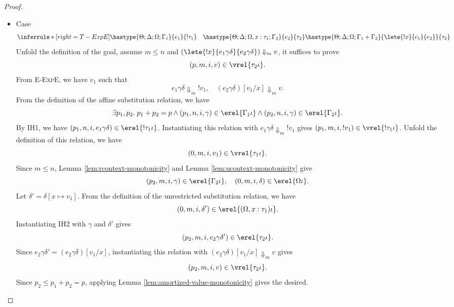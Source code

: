 \begin{proof}
\begin{itemize}
\item Case
\[
  \inferrule*[right=T-ExpE]
    {\hastype{\Theta;\Delta;\Omega;\Gamma_1}{e_1}{!\tau_1}
      \quad\hastype{\Theta;\Delta;\Omega,x:\tau_1;\Gamma_2}{e_2}{\tau_2}}
    {\hastype{\Theta;\Delta;\Omega;\Gamma_1+\Gamma_2}
      {\lete{!x}{e_1}{e_2}}{\tau_2}}
\]
Unfold the definition of the goal, assume $m\leq n$ and
$(\lete{!x}{e_1\gamma\delta}{e_2\gamma\delta})\Downarrow_m v$, it suffices to prove
\[(p, m, i, v)\in\vrel{\tau_2\iota}.\]
From \textsc{E-ExpE}, we have $v_1$ such that
\[
  e_1\gamma\delta\Downarrow_m !v_1, \quad (e_2\gamma\delta)[v_1/x]\Downarrow_m v.
\]
From the definition of the affine substitution relation, we have
\[
  \exists p_1, p_2.\;p_1 + p_2= p \land
  (p_1,n,i,\gamma) \in \erel{\Gamma_1\iota} \land
  (p_2,n, i, \gamma) \in \erel{\Gamma_2\iota}.
\]
By IH1, we have $(p_1, n, i, e_1\gamma\delta)\in\erel{!\tau_1\iota}$. Instantiating this relation with
$e_1\gamma\delta\Downarrow_m !v_1$ gives $(p_1, m, i, !v_1)\in\vrel{!\tau_1\iota}$.
Unfold the definition of this relation, we have
\[(0, m, i, v_1)\in\vrel{\tau_1\iota}.\]
Since $m \leq n$, Lemma \ref{lem:rcontext-monotonicity} and Lemma \ref{lem:ucontext-monotonicity} give
\[(p_2, m, i, \gamma)\in\erel{\Gamma_2\iota}, \quad (0, m, i, \delta)\in\erel{\Omega\iota}.\]
Let $\delta' = \delta[x\mapsto v_1]$. From the definition of the unrestricted substitution relation, we have
\[(0, m, i, \delta')\in\erel{(\Omega, x:\tau_1)\iota}.\]
Instantiating IH2 with $\gamma$ and $\delta'$ gives
\[(p_2, m, i, e_2\gamma\delta')\in\erel{\tau_2\iota}.\]
Since $e_2\gamma\delta' = (e_2\gamma\delta)[v_1/x]$, instantiating this relation with
$(e_2\gamma\delta)[v_1/x]\Downarrow_m v$ gives
\[(p_2, m, i, v)\in\vrel{\tau_2\iota}.\]
Since $p_2 \leq p_1+p_2 = p$, applying Lemma \ref{lem:amortized-value-monotonicity} gives the desired.


\end{itemize}
\end{proof}
